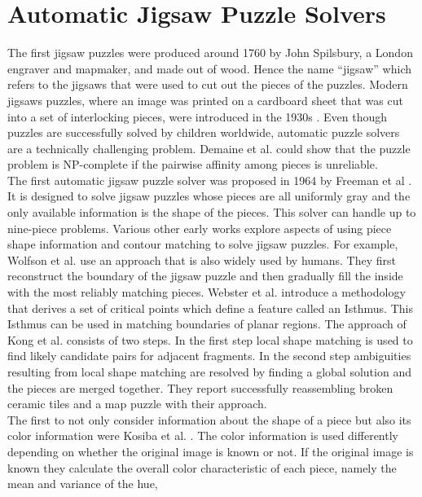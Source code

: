\documentclass[11pt]{report}
\begin{document}
\section{Automatic Jigsaw Puzzle Solvers}
The first jigsaw puzzles were produced around 1760 by John Spilsbury, a
London engraver and mapmaker, and made out of wood.
Hence the name ``jigsaw'' which refers to the jigsaws that were used to cut out
the pieces of the puzzles. Modern jigsaws puzzles, where an image was printed on
a cardboard sheet that was cut into a set of interlocking pieces, were introduced
in the 1930s \cite{williams2004jigsaw}. Even though puzzles are successfully
solved by children worldwide, automatic puzzle solvers are a technically
challenging problem. Demaine et al. \cite{demaine2007jigsaw} could show that the
puzzle problem is NP-complete if the pairwise affinity among pieces is
unreliable. \\
The first automatic jigsaw puzzle solver was proposed in 1964 by Freeman et al
\cite{freeman1964apictorial}. It is designed to solve jigsaw puzzles whose
pieces are all uniformly gray and the only available information is the
shape of the pieces. This solver can handle up to nine-piece problems. Various other
early works explore aspects of using piece shape information and contour
matching to solve jigsaw puzzles. For example, Wolfson et al. \cite{wolfson1988solving}
use an approach that is also widely used by humans. They first reconstruct the boundary of
the jigsaw puzzle and then gradually fill the inside with the most reliably matching
pieces. Webster et al. \cite{webster1990computer} introduce a methodology that
derives a set of critical points which define a feature called an Isthmus. This
Isthmus can be used in matching boundaries of planar regions. The approach of
Kong et al. \cite{kong2001solving} consists of two steps. In the first step
local shape matching is used to find likely candidate pairs for adjacent
fragments. In the second step ambiguities resulting from local shape matching
are resolved by finding a global solution and the pieces are merged together.
They report successfully reassembling broken ceramic tiles and a map puzzle with
their approach. \\
The first to not only consider information about the shape of a piece but also
its color information were Kosiba et al. \cite{kosiba1994automatic}. The color
information is used differently depending on whether the original image is known
or not. If the original image is known they calculate the overall color
characteristic of each piece, namely the mean and variance of the hue,
\end{document}
